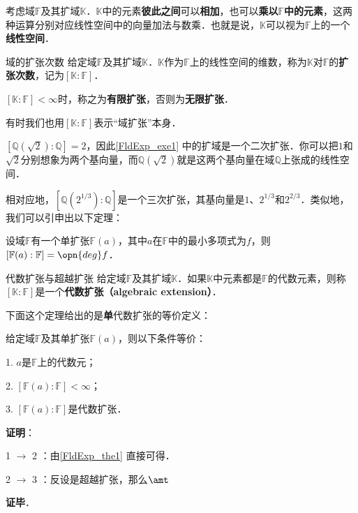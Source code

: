 考虑域$\mathbb{F}$及其扩域$\mathbb{K}$．$\mathbb{K}$中的元素\textbf{彼此之间}可以\textbf{相加}，也可以\textbf{乘以}$\mathbb{F}$\textbf{中的元素}，这两种运算分别对应线性空间中的向量加法与数乘．也就是说，$\mathbb{K}$可以视为$\mathbb{F}$上的一个\textbf{线性空间}．

\begin{definition}{域的扩张次数}
给定域$\mathbb{F}$及其扩域$\mathbb{K}$．$\mathbb{K}$作为$\mathbb{F}$上的线性空间的维数，称为$\mathbb{K}$对$\mathbb{F}$的\textbf{扩张次数}，记为$[\mathbb{K}:\mathbb{F}]$．

$[\mathbb{K}:\mathbb{F}]<\infty$时，称之为\textbf{有限扩张}，否则为\textbf{无限扩张}．

有时我们也用$[\mathbb{K}:\mathbb{F}]$表示“域扩张”本身．
\end{definition}

$[\mathbb{Q}(\sqrt{2}):\mathbb{Q}]=2$，因此\autoref{FldExp_exe1} 中的扩域是一个二次扩张．你可以把$1$和$\sqrt{2}$分别想象为两个基向量，而$\mathbb{Q}(\sqrt{2})$就是这两个基向量在域$\mathbb{Q}$上张成的线性空间．

相对应地，$[\mathbb{Q}(2^{1/3}):\mathbb{Q}]$是一个三次扩张，其基向量是$1$、$2^{1/3}$和$2^{2/3}$．类似地，我们可以引申出以下定理：

\begin{theorem}{}\label{FldExp_the1}
设域$\mathbb{F}$有一个单扩张$\mathbb{F}(a)$，其中$a$在$\mathbb{F}$中的最小多项式为$f$，则$[\mathbb{F}(a):\mathbb{F}]=\opn{deg}f$．
\end{theorem}

\begin{definition}{代数扩张与超越扩张}
给定域$\mathbb{F}$及其扩域$\mathbb{K}$．如果$\mathbb{K}$中元素都是$\mathbb{F}$的代数元素，则称$[\mathbb{K}:\mathbb{F}]$是一个\textbf{代数扩张（algebraic extension）}．
\end{definition}

下面这个定理给出的是\textbf{单}代数扩张的等价定义：

\begin{theorem}{}
给定域$\mathbb{F}$及其单扩张$\mathbb{F}(a)$，则以下条件等价：

1. $a$是$\mathbb{F}$上的代数元；

2. $[\mathbb{F}(a):\mathbb{F}]<\infty$；

3. $[\mathbb{F}(a):\mathbb{F}]$是代数扩张．

\end{theorem}


\textbf{证明}：

1 $\to$ 2 ：由\autoref{FldExp_the1} 直接可得．

2 $\to$ 3 ：反设是超越扩张，那么$\amt$

\textbf{证毕}．
























